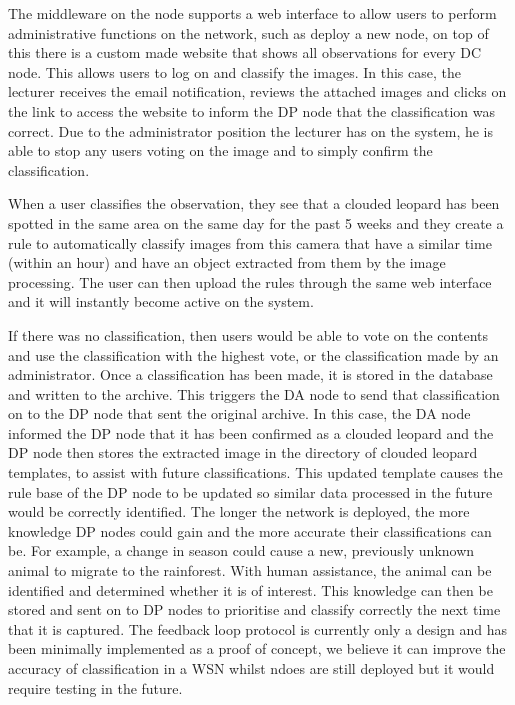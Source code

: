 			The middleware on the node supports a web interface to allow users to perform administrative functions on the network, such as deploy a new node, on top of this there is a custom made website that shows all observations for every DC node. This allows users to log on and classify the images. In this case, the lecturer receives the email notification, reviews the attached images and clicks on the link to access the website to inform the DP node that the classification was correct. Due to the administrator position the lecturer has on the system, he is able to stop any users voting on the image and to simply confirm the classification.
			
			When a user classifies the observation, they see that a clouded leopard has been spotted in the same area on the same day for the past 5 weeks and they create a rule to automatically classify images from this camera that have a similar time (within an hour) and have an object extracted from them by the image processing. The user can then upload the rules through the same web interface and it will instantly become active on the system.

			If there was no classification, then users would be able to vote on the contents and use the classification with the highest vote, or the classification made by an administrator. Once a classification has been made, it is stored in the database and written to the archive. This triggers the DA node to send that classification on to the DP node that sent the original archive. In this case, the DA node informed the DP node that it has been confirmed as a clouded leopard and the DP node then stores the extracted image in the directory of clouded leopard templates, to assist with future classifications. This updated template causes the rule base of the DP node to be updated so similar data processed in the future would be correctly identified. The longer the network is deployed, the more knowledge DP nodes could gain and the more accurate their classifications can be. For example, a change in season could cause a new, previously unknown animal to migrate to the rainforest. With human assistance, the animal can be identified and determined whether it is of interest. This knowledge can then be stored and sent on to DP nodes to prioritise and classify correctly the next time that it is captured. The feedback loop protocol is currently only a design and has been minimally implemented as a proof of concept, we believe it can improve the accuracy of classification in a WSN whilst ndoes are still deployed but it would require testing in the future.
					
